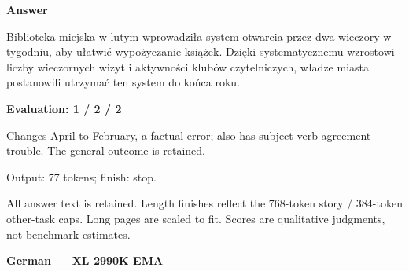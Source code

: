 \documentclass[10pt]{article}
\begin{document}
{\begin{minipage}{\textwidth}
\textbf{Answer}\par Biblioteka miejska w lutym wprowadziła system otwarcia przez dwa wieczory w tygodniu, aby ułatwić wypożyczanie książek. Dzięki systematycznemu wzrostowi liczby wieczornych wizyt i aktywności klubów czytelniczych, władze miasta postanowili utrzymać ten system do końca roku.\par\smallskip
\textbf{Evaluation: 1 / 2 / 2}\par Changes April to February, a factual error; also has subject-verb agreement trouble. The general outcome is retained.
\par {\color{gray} Output: 77 tokens; finish: stop.}\par
\medskip\footnotesize All answer text is retained. Length finishes reflect the 768-token story / 384-token other-task caps. Long pages are scaled to fit. Scores are qualitative judgments, not benchmark estimates.
\end{minipage}}%
\noindent\ifdim\dimexpr\ht\languagepage+\dp\languagepage\relax>0.93\textheight%
\resizebox*{!}{0.93\textheight}{\usebox{\languagepage}}%
\else\usebox{\languagepage}\fi%
\clearpage
{\Large\bfseries German --- XL 2990K EMA}\par\smallskip
\end{document}
